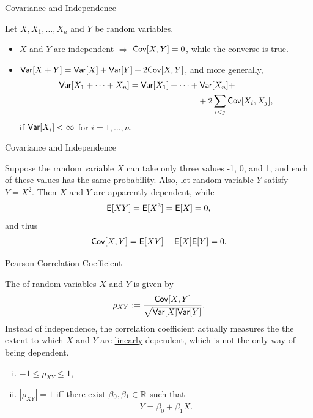 \begin{frame}{Covariance and Independence}

Let $X, X_1, \ldots, X_n$ and $Y$ be random variables.
\begin{itemize}
	\justifying
	\item $X$ and $Y$ are independent $\Rightarrow$ $\mathsf{Cov}[X, Y] = 0$, while the converse is  true. \\
	\item $\mathsf{Var}[X + Y] = \mathsf{Var}[X] + \mathsf{Var}[Y] + 2\mathsf{Cov}[X, Y]$, and more generally,
	\begin{align*}
	\mathsf{Var}[X_1 + \cdots + X_n] & = \mathsf{Var}[X_1] + \cdots + \mathsf{Var}[X_n] + \\
	& \qquad\qquad\qquad\qquad + 2\sum_{i<j} \mathsf{Cov}[X_i, X_j],
	\end{align*}
	if $\mathsf{Var}[X_i] < \infty$ for $i = 1, \ldots, n$.
\end{itemize}

\end{frame}


\begin{frame}{Covariance and Independence}

\justifying
{} Suppose the random variable $X$ can take only three values -1, 0, and 1, and each of these values has the same probability. Also, let random variable $Y$ satisfy $Y = X^2$. Then $X$ and $Y$ are apparently dependent, while
\begin{align*}
\mathsf{E}[XY] = \mathsf{E}[X^3] = \mathsf{E}[X] = 0,
\end{align*}
and thus
\begin{align*}
\mathsf{Cov}[X, Y] = \mathsf{E}[XY] - \mathsf{E}[X]\mathsf{E}[Y] = 0.
\end{align*}


\end{frame}

\begin{frame}{Pearson Correlation Coefficient}

\justifying
{} The  of random variables $X$ and $Y$ is given by
\begin{align*}
\rho_{XY} := \frac{\mathsf{Cov}[X, Y]}{\sqrt{\mathsf{Var}[X]\mathsf{Var}[Y]}}.
\end{align*}
 Instead of independence, the correlation coefficient actually measures the the extent to which $X$ and $Y$ are \underline{linearly} dependent, which is not the only way of being dependent. \\
\begin{enumerate}[(i).]
	\item $-1\leq \rho_{XY} \leq 1$,
	\item $|\rho_{XY}| = 1$ iff there exist $\beta_0, \beta_1 \in \mathbb{R}$ such that
	\begin{align*}
	 Y = \beta_0 + \beta_1X.
	\end{align*}
\end{enumerate}

\end{frame}

